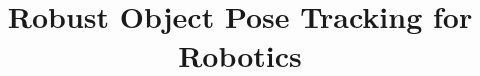 \documentclass[final]{IEEEtran}
\begin{document}
\title{Robust Object Pose Tracking for Robotics}


\author{
\and
{}
\and
{}
}



%


\maketitle
\end{document}
